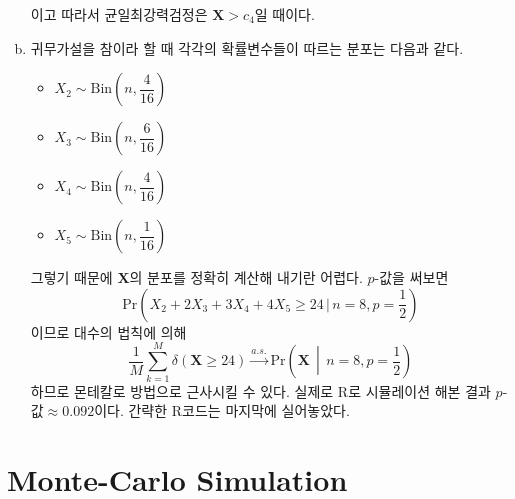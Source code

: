 \documentclass[answers]{exam}
\begin{document}
\begin{questions}
\begin{solution}
\begin{enumerate}[(a)]
      이고 따라서 균일최강력검정은 $\mathbf{X}>c_{4}$일 때이다.
      \item 귀무가설을 참이라 할 때 각각의 확률변수들이 따르는 분포는 다음과 같다.
      \begin{itemize}
        \item $X_{2}\sim \mathrm{Bin}\left(n,\dfrac{4}{16}\right)$
        \item $X_{3}\sim \mathrm{Bin}\left(n,\dfrac{6}{16}\right)$
        \item $X_{4}\sim \mathrm{Bin}\left(n,\dfrac{4}{16}\right)$
        \item $X_{5}\sim \mathrm{Bin}\left(n,\dfrac{1}{16}\right)$
      \end{itemize}
      그렇기 때문에 $\mathbf{X}$의 분포를 정확히 계산해 내기란 어렵다. $p$-값을 써보면
      \begin{equation}
        \mathrm{Pr}\left(X_{2}+2X_{3}+3X_{4}+4X_{5}\geq 24\,|\,n=8,p=\dfrac{1}{2}\right)
      \end{equation}
      이므로 대수의 법칙에 의해
      \begin{equation}
        \dfrac{1}{M}\sum_{k=1}^{M}\delta\left(\mathbf{X}\geq 24\right) \xrightarrow{a.s.} \mathrm{Pr}\left(\mathbf{X}\,\middle|\,n=8,p=\dfrac{1}{2}\right)
      \end{equation}
      하므로 몬테칼로 방법으로 근사시킬 수 있다. 실제로 \textsf{R}로 시뮬레이션 해본 결과 $p$-값$\approx 0.092$이다. 간략한 \textsf{R}코드는 마지막에 실어놓았다.
    \end{enumerate}
   \end{solution}
\end{questions}
\newpage
\appendix
\section{Monte-Carlo Simulation}

\end{document}
